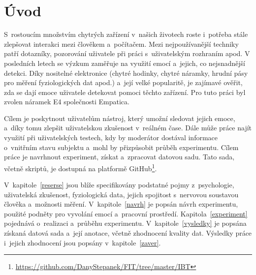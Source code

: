 \chapter{Úvod}
S~rostoucím množstvím chytrých zařízení v~našich životech roste i~potřeba stále zlepšovat interakci mezi člověkem a~počítačem. Mezi nejpoužívanější techniky patří dotazníky, pozorování uživatele při práci s~uživatelským rozhraním apod. V posledních letech se výzkum zaměřuje na využití emocí a~jejich, co nejsnadnější detekci. Díky nositelné elektronice (chytré hodinky, chytré náramky, hrudní pásy pro měření fyziologických dat apod.) a~její velké popularitě, je zajímavé ověřit, zda se dají emoce uživatele detekovat pomoci těchto zařízení. Pro tuto práci byl zvolen náramek E4 společnosti Empatica.

Cílem je poskytnout uživatelům nástroj, který umožní sledovat jejich emoce, a~díky tomu zlepšit uživatelskou zkušenost v~reálném čase. Dále může práce najít využití při uživatelských testech, kdy by moderátor dostával informace o~vnitřním stavu subjektu a~mohl by přizpůsobit průběh experimentu. Cílem práce je navrhnout experiment, získat a~zpracovat datovou sadu. Tato sada, včetně skriptů, je dostupná na platformě GitHub\footnote{\url{https://github.com/DanyStepanek/FIT/tree/master/IBT}}.

V~kapitole~\ref{reserse} jsou blíže specifikovány podstatné pojmy z~psychologie, uživatelská zkušenost, fyziologická data, jejich spojitost s~nervovou soustavou člověka a~možnosti měření. V~kapitole~\ref{navrh} je popsán návrh experimentu, použité podněty pro vyvolání emocí a~pracovní prostředí. Kapitola~\ref{experiment} pojednává o~realizaci a~průběhu experimentu. V~kapitole~\ref{vysledky} je popsána získaná datová sada a~její anotace, včetně zhodnocení kvality dat. Výsledky práce i~jejich zhodnocení jsou popsány v~kapitole~\ref{zaver}.  